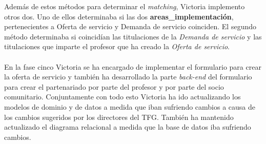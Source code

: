 \documentclass[11pt]{book}
\begin{document}
	Además de estos métodos para determinar el \textit{matching}, Victoria implemento otros dos. Uno de ellos determinaba si las dos \textbf{areas\_implementación}, pertenecientes a Oferta de servicio y Demanda de servicio coinciden. El segundo método determinaba si coincidían las titulaciones de la \textit{Demanda de servicio} y las titulaciones que imparte el profesor que ha creado la \textit{Oferta de servicio}.\\\\
	En la fase cinco Victoria se ha encargado de implementar el formulario para crear la oferta de servicio y también ha desarrollado la parte \textit{back-end} del formulario para crear el partenariado por parte del profesor y por parte del socio comunitario.
	Conjuntamente con todo esto Victoria ha ido actualizando los modelos de dominio y de datos a medida que iban sufriendo cambios a causa de los cambios sugeridos por los directores del TFG. También ha mantenido actualizado el diagrama relacional a medida que la base de datos iba sufriendo cambios.
	\newpage
\end{document}
